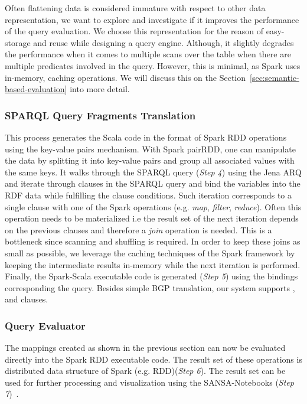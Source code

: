 Often flattening data is considered immature with respect to other data representation, we want to explore and investigate if it improves the performance of the query evaluation.
We choose this representation for the reason of easy-storage and reuse while designing a query engine. 
Although, it slightly degrades the performance when it comes to multiple scans over the table when there are multiple predicates involved in the query. However, this is minimal, as Spark uses in-memory, caching operations.
We will discuss this on the Section~\ref{sec:semantic-based-evaluation} into more detail.

\subsubsection{SPARQL Query Fragments Translation}
This process generates the Scala code in the format of Spark RDD operations using the key-value pairs mechanism.
With Spark pairRDD, one can manipulate the data by splitting it into key-value pairs and group all associated values with the same keys. 
It walks through the SPARQL query (\textit{Step 4}) using the Jena ARQ and iterate through clauses in the SPARQL query and bind the variables into the RDF data while fulfilling the clause conditions.
Such iteration corresponds to a single clause with one of the Spark operations (e.g. \emph{map}, \emph{filter}, \emph{reduce}).
Often this operation needs to be materialized i.e the result set of the next iteration depends on the previous clauses and therefore a \emph{join} operation is needed.
This is a bottleneck since scanning and shuffling is required.
In order to keep these joins as small as possible, we leverage the caching techniques of the Spark framework by keeping the intermediate results in-memory while the next iteration is performed.
Finally, the Spark-Scala executable code is generated (\textit{Step 5}) using the bindings corresponding the query.
Besides simple BGP translation, our system supports ,  and  clauses.

\subsubsection{Query Evaluator}
The mappings created as shown in the previous section can now be evaluated directly into the Spark RDD executable code.
The result set of these operations is distributed data structure of Spark (e.g. RDD)(\textit{Step 6}).
The result set can be used for further processing and visualization using the SANSA-Notebooks (\textit{Step 7})~\cite{iermilov-2017-sansa-iswc-demo}.


